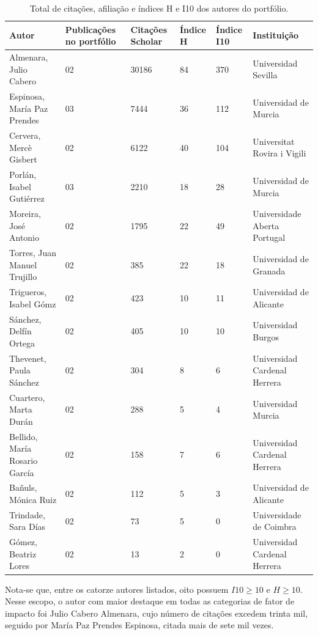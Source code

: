 \documentclass[portuguese]{textolivre}
\begin{document}
\begin{table}[h!]
\centering
\begin{threeparttable}
\caption{Total de citações, afiliação e índices H e I10 dos autores do portfólio.}
\begin{tabular}{p{}p{}p{}p{}p{}p{}}
\toprule
Autor & Publicações no portfólio & Citações Scholar & Índice H &	Índice I10 & Instituição \\
\midrule
Almenara, Julio Cabero & 02 & 30186 & 84 & 370 & Universidad Sevilla \\
Espinosa, María Paz Prendes & 03 & 7444 & 36 & 112 & Universidad de Murcia \\
Cervera, Mercè Gisbert & 02 & 6122 & 40 & 104 & Universitat Rovira i Vigili \\
Porlán, Isabel Gutiérrez & 03 & 2210 & 18 & 28 & Universidad de Murcia \\
Moreira, José Antonio & 02 & 1795 & 22 & 49 & Universidade Aberta Portugal \\
Torres, Juan Manuel Trujillo & 02 & 385 & 22 & 18 & Universidad de Granada \\
Trigueros, Isabel Gómz & 02 & 423 & 10 & 11 & Universidad de Alicante \\
Sánchez, Delfín Ortega & 02 & 405 & 10 & 10 & Universidad Burgos\\
Thevenet, Paula Sánchez & 02 & 304 & 8 & 6 & Universidad Cardenal Herrera \\
Cuartero, Marta Durán & 02 & 288 & 5 & 4 & Universidad Murcia \\
Bellido, María Rosario García & 02 & 158 & 7 & 6 & Universidad Cardenal Herrera \\
Bañuls, Mónica Ruiz & 02 & 112 & 5 & 3 & Universidad de Alicante \\
Trindade, Sara Días & 02 & 73 & 5 & 0 & Universidade de Coimbra \\
Gómez, Beatriz Lores & 02 & 13 & 2 & 0 & Universidad Cardenal Herrera \\
\bottomrule
\end{tabular}
\label{Table02}
\end{threeparttable}
\end{table}

Nota-se que, entre os catorze autores listados, oito possuem $I10\geqslant10$ e $H\geqslant10$. Nesse escopo, o autor com maior destaque em todas as categorias de fator de impacto foi Julio Cabero Almenara, cujo número de citações excedem trinta mil, seguido por María Paz Prendes Espinosa, citada mais de sete mil vezes.
\end{document}
